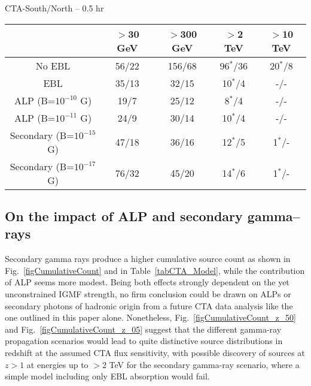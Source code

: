 \documentclass[final,5p]{elsarticle}
\begin{document}
\begin{table*}[h!]
\begin{center}
CTA-South/North -- 0.5 hr\\
\begin{tabular}{ccccc}
\midrule
& $>$30 GeV & $>$300 GeV  & $>$2 TeV   & $>$10 TeV \\
\midrule
\addlinespace
No EBL   &  56/22  &  156/68  &  96$^*$/36  &  20$^*$/8\\
EBL   &  35/13  &  32/15  &  10$^*$/4  &  -/-\\
ALP (B=$10^{-10}$ G)   &  19/7  &  25/12  &  8$^*$/4  &  -/-\\
ALP (B=$10^{-11}$ G)    &  24/9  &  30/14  &  10$^*$/4  &  -/-\\
Secondary (B=$10^{-15}$ G)    &  47/18  &  36/16  &  12$^*$/5  &  1$^*$/-\\
Secondary (B=$10^{-17}$ G)   &  76/32  &  45/20  &  14$^*$/6  &  1$^*$/-\\
\bottomrule
\end{tabular}
\end{center}
\caption{Estimated source count for a blind survey of 250 hours with observations of 0.5 hr with CTA-South and CTA-North in different energy bands and for the models considered in this paper. See text for further details. Note: `-' mark denotes no expected detection; `*' this source count corresponds to a survey of half of the sky, which is completed in $\approx$130 hours}
\label{tabCTA_Model}
\end{table*}


\subsection{On the impact of ALP and secondary gamma--rays}  Secondary gamma rays produce a higher cumulative source count as shown in Fig.~\ref{figCumulativeCount} and in Table~\ref{tabCTA_Model}, while the contribution of ALP seems more modest. Being both effects strongly dependent on the yet unconstrained IGMF strength, no firm conclusion could be drawn on ALPs or secondary photons of hadronic origin from a future CTA data analysis like the one outlined in this paper alone. Nonetheless, Fig.~\ref{figCumulativeCount_z_50} and Fig.~\ref{figCumulativeCount_z_05} suggest that the different gamma-ray propagation scenarios would lead to quite distinctive source distributions in redshift at the assumed CTA flux sensitivity, with possible discovery of sources at $z>1$ at energies up to $>2$ TeV for the secondary gamma-ray scenario, where a simple model including only EBL absorption would fail.
\end{document}
